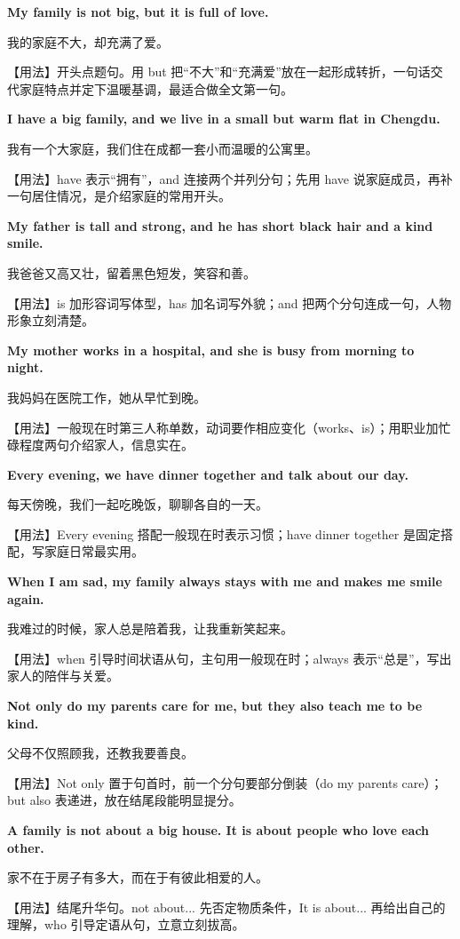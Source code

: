 \documentclass[UTF8,a4paper,11pt,oneside]{ctexbook}
\newcommand{\fansection}[1]{%
  \par\addvspace{2.4ex}%
  \Needspace{6\baselineskip}%
  \noindent{\sffamily\Large\bfseries\color{mainblue}#1}\par
  \nopagebreak
  \addvspace{0.2ex}%
  \noindent{\color{rulelight}\rule{\linewidth}{0.9pt}}\par
  \addvspace{0.9ex}%
  \nobreak
}
\newcommand{\fanpat}[3]{%
  \item{\bfseries #1}\par\nopagebreak
  {\small\color{textgray}#2}\par\nopagebreak
  {\footnotesize\color{accent!90!black}【用法】#3}\par
}
\begin{document}
\fansection{〇、本单元写作常用句型}
\begin{fanpatterns}
\fanpat{My family is not big, but it is full of love.}{我的家庭不大，却充满了爱。}{开头点题句。用 but 把“不大”和“充满爱”放在一起形成转折，一句话交代家庭特点并定下温暖基调，最适合做全文第一句。}

\fanpat{I have a big family, and we live in a small but warm flat in Chengdu.}{我有一个大家庭，我们住在成都一套小而温暖的公寓里。}{have 表示“拥有”，and 连接两个并列分句；先用 have 说家庭成员，再补一句居住情况，是介绍家庭的常用开头。}

\fanpat{My father is tall and strong, and he has short black hair and a kind smile.}{我爸爸又高又壮，留着黑色短发，笑容和善。}{is 加形容词写体型，has 加名词写外貌；and 把两个分句连成一句，人物形象立刻清楚。}

\fanpat{My mother works in a hospital, and she is busy from morning to night.}{我妈妈在医院工作，她从早忙到晚。}{一般现在时第三人称单数，动词要作相应变化（works、is）；用职业加忙碌程度两句介绍家人，信息实在。}

\fanpat{Every evening, we have dinner together and talk about our day.}{每天傍晚，我们一起吃晚饭，聊聊各自的一天。}{Every evening 搭配一般现在时表示习惯；have dinner together 是固定搭配，写家庭日常最实用。}

\fanpat{When I am sad, my family always stays with me and makes me smile again.}{我难过的时候，家人总是陪着我，让我重新笑起来。}{when 引导时间状语从句，主句用一般现在时；always 表示“总是”，写出家人的陪伴与关爱。}

\fanpat{Not only do my parents care for me, but they also teach me to be kind.}{父母不仅照顾我，还教我要善良。}{Not only 置于句首时，前一个分句要部分倒装（do my parents care）；but also 表递进，放在结尾段能明显提分。}

\fanpat{A family is not about a big house. It is about people who love each other.}{家不在于房子有多大，而在于有彼此相爱的人。}{结尾升华句。not about... 先否定物质条件，It is about... 再给出自己的理解，who 引导定语从句，立意立刻拔高。}

\end{fanpatterns}

\fansection{一、满分范文}
\end{document}
